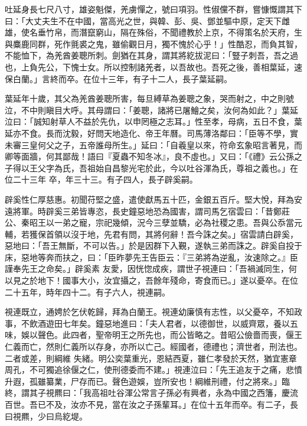 \begin{pinyinscope}
 吐延身長七尺八寸，雄姿魁傑，羌虜憚之，號曰項羽。性俶儻不群，嘗慷慨謂其下曰：「大丈夫生不在中國，當高光之世，與韓、彭、吳、鄧並驅中原，定天下雌雄，使名垂竹帛，而潛竄窮山，隔在殊俗，不聞禮教於上京，不得策名於天府，生與麋鹿同群，死作氈裘之鬼，雖偷觀日月，獨不愧於心乎！」性酷忍，而負其智，不能恤下，為羌酋姜聰所刺。劍猶在其身，謂其將紇拔泥曰：「豎子刺吾，吾之過也，上負先公，下愧士女。所以控制諸羌者，以吾故也。吾死之後，善相葉延，速保白蘭。」言終而卒。在位十三年，有子十二人，長子葉延嗣。



 葉延年十歲，其父為羌酋姜聰所害，每旦縛草為姜聰之象，哭而射之，中之則號泣，不中則瞋目大呼。其母謂曰：「姜聰，諸將已屠鱠之矣，汝何為如此？」葉延泣曰：「誠知射草人不益於先仇，以申罔極之志耳。」性至孝，母病，五日不食，葉延亦不食。長而沈毅，好問天地造化、帝王年曆。司馬薄洛鄰曰：「臣等不學，實未審三皇何父之子，五帝誰母所生。」延曰：「自羲皇以來，符命玄象昭言著見，而卿等面牆，何其鄙哉！語曰『夏蟲不知冬冰』，良不虛也。」又曰：「《禮》云公孫之子得以王父字為氏，吾祖始自昌黎光宅於此，今以吐谷渾為氏，尊祖之義也。」在位二十三年
 卒，年三十三。有子四人，長子辟奚嗣。



 辟奚性仁厚慈惠。初聞苻堅之盛，遣使獻馬五十匹，金銀五百斤。堅大悅，拜為安遠將軍。時辟奚三弟皆專恣，長史鐘惡地恐為國害，謂司馬乞宿雲曰：「昔鄭莊公、秦昭王以一弟之寵，宗祀幾傾，況今三孽並驕，必為社稷之患。吾與公忝當元輔，若獲保首領以沒于地，先君有問，其將何辭！吾今誅之矣。」宿雲請白辟奚，惡地曰：「吾王無斷，不可以告。」於是因群下入覲，遂執三弟而誅之。辟奚自投于床，惡地等奔而扶之，曰：「臣昨夢先王告臣云：『三弟將為逆亂，汝速除之。』臣謹奉先王之命矣。」辟奚素
 友愛，因恍惚成疾，謂世子視連曰：「吾禍滅同生，何以見之於地下！國事大小，汝宜攝之，吾餘年殘命，寄食而已。」遂以憂卒。在位二十五年，時年四十二。有子六人，視連嗣。



 視連既立，通娉於乞伏乾歸，拜為白蘭王。視連幼廉慎有志性，以父憂卒，不知政事，不飲酒遊田七年矣。鐘惡地進曰：「夫人君者，以德御世，以威齊眾，養以五味，娛以聲色。此四者，聖帝明王之所先也，而公皆略之。昔昭公儉嗇而喪，偃王仁義而亡，然則仁義所以存身，亦所以亡己。經國者，德禮也；濟世者，刑法也。二者或差，則綱維
 失緒。明公奕葉重光，恩結西夏，雖仁孝發於天然，猶宜憲章周孔，不可獨追徐偃之仁，使刑德委而不建。」視連泣曰：「先王追友于之痛，悲憤升遐，孤雖纂業，尸存而已。聲色遊娛，豈所安也！綱維刑禮，付之將來。」臨終，謂其子視羆曰：「我高祖吐谷渾公常言子孫必有興者，永為中國之西籓，慶流百世。吾已不及，汝亦不見，當在汝之子孫輩耳。」在位十五年而卒。有二子，長曰視羆，少曰烏紇堤。




\end{pinyinscope}
